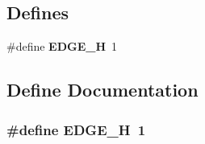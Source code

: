 \subsection*{Defines}
\begin{CompactItemize}
\item 
\#define {\bf EDGE\_\-H}~1
\end{CompactItemize}


\subsection{Define Documentation}
\subsubsection{\setlength{\rightskip}{0pt plus 5cm}\#define EDGE\_\-H~1}\label{edge_8h_135be90ddca4c44e8c2d171d650a8411}


